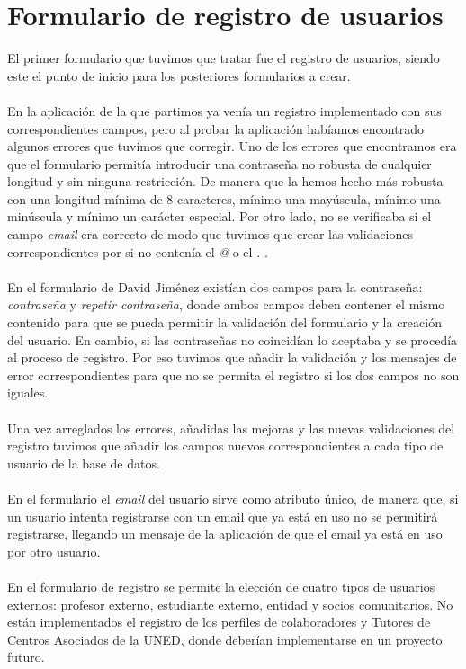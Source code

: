 \documentclass[11pt]{book}
\begin{document}
	\section{Formulario de registro de usuarios}
	El primer formulario que tuvimos que tratar fue el registro de usuarios, siendo este el punto de inicio para los posteriores formularios a crear.\\\\
	En la aplicación de la que partimos ya venía un registro implementado con sus correspondientes campos, pero al probar la aplicación habíamos encontrado algunos errores que tuvimos que corregir. Uno de los errores que encontramos era que el formulario permitía introducir una contraseña no robusta de cualquier longitud y sin ninguna restricción. De manera que la hemos hecho más robusta con una longitud mínima de 8 caracteres, mínimo una mayúscula, mínimo una minúscula y mínimo un carácter especial. Por otro lado, no se verificaba si el campo \emph{email} era correcto de modo que tuvimos que crear las validaciones correspondientes por si no contenía el \emph{@} o el \emph{.} .\\\\
	En el formulario de David Jiménez existían dos campos para la contraseña: \emph{contraseña} y   \emph{repetir contraseña}, donde ambos campos deben contener el mismo contenido para que se pueda permitir la validación del formulario y la creación del usuario. En cambio, si las contraseñas no coincidían lo aceptaba y se procedía al proceso de registro. Por eso tuvimos que añadir la validación y los mensajes de error correspondientes para que no se permita el registro si los dos campos no son iguales.\\\\
	Una vez arreglados los errores, añadidas las mejoras y las nuevas validaciones del registro tuvimos que añadir los campos nuevos correspondientes a cada tipo de usuario de la base de datos. \\\\
	En el formulario el \emph{email} del usuario sirve como atributo único, de manera que, si un usuario intenta registrarse con un email que ya está en uso no se permitirá registrarse, llegando un mensaje de la aplicación de que el email ya está en uso por otro usuario. \\\\
	En el formulario de registro se permite la elección de cuatro tipos de usuarios externos: profesor externo, estudiante externo, entidad y socios comunitarios. No están implementados el registro de los perfiles de colaboradores y Tutores de Centros Asociados de la UNED, donde deberían implementarse en un proyecto futuro.\\\\
\end{document}
